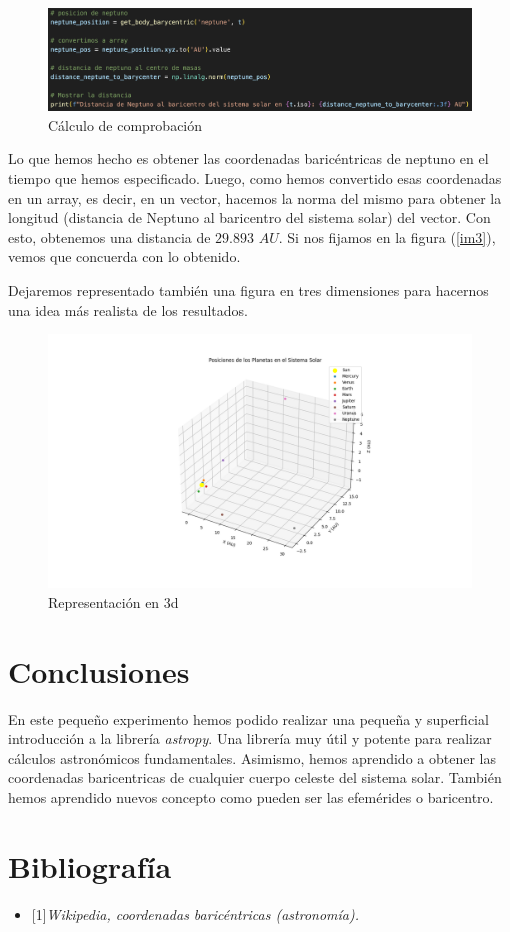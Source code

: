 \documentclass[12pt]{article}
\begin{document}
\begin{figure}[!h]
    \centering
    \includegraphics[scale=0.4]{codigo.png}
    \caption{Cálculo de comprobación}
    \label{im4}
\end{figure}

Lo que hemos hecho es obtener las coordenadas baricéntricas de neptuno en el tiempo que hemos especificado. Luego,
como hemos convertido esas coordenadas en un array, es decir, en un vector, hacemos la norma del mismo para obtener la
longitud (distancia de Neptuno al baricentro del sistema solar) del vector. Con esto, obtenemos una distancia de $29.893$ $AU$. 
Si nos fijamos en la figura (\ref{im3}), vemos que concuerda con lo obtenido. 

\vspace{5mm}

Dejaremos representado también una figura en tres dimensiones para hacernos una idea más realista de los resultados.
\begin{figure}[!h]
    \centering
    \includegraphics[scale=0.4]{3d.png}
    \caption{Representación en 3d}
    \label{im5}
\end{figure}

\newpage

\section{Conclusiones}
En este pequeño experimento hemos podido realizar una pequeña y superficial introducción a la librería \textit{astropy}. Una librería
muy útil y potente para realizar cálculos astronómicos fundamentales. Asimismo, hemos aprendido a obtener las coordenadas
baricentricas de cualquier cuerpo celeste del sistema solar. También hemos aprendido nuevos concepto como pueden ser las efemérides
o baricentro.

\newpage

\section{Bibliografía}
\begin{itemize}
    \item 
       {[1]\emph{Wikipedia, coordenadas baricéntricas (astronomía).}}
   \end{itemize}
\end{document}
